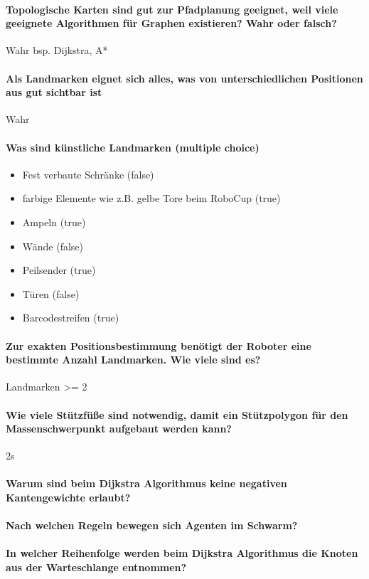 \paragraph{Topologische Karten sind gut zur Pfadplanung geeignet, weil viele geeignete Algorithmen für Graphen existieren? Wahr oder falsch?}
Wahr bsp. Dijkstra, A*
\paragraph{Als Landmarken eignet sich alles, was von unterschiedlichen Positionen aus gut sichtbar ist}
Wahr
\paragraph{Was sind künstliche Landmarken (multiple choice)}
\begin{itemize}
	\item Fest verbaute Schränke (false)
    \item farbige Elemente wie z.B. gelbe Tore beim RoboCup (true)
    \item Ampeln (true)
    \item Wände (false)
    \item Peilsender (true)
    \item Türen (false)
    \item Barcodestreifen (true)
\end{itemize}
\paragraph{Zur exakten Positionsbestimmung benötigt der Roboter eine bestimmte Anzahl Landmarken. Wie viele sind es?}
Landmarken >= 2
\paragraph{Wie viele Stützfüße sind notwendig, damit ein Stützpolygon für den Massenschwerpunkt aufgebaut werden kann?}
2s
\paragraph{Warum sind beim Dijkstra Algorithmus keine negativen Kantengewichte erlaubt?}
\paragraph{Nach welchen Regeln bewegen sich Agenten im Schwarm?}
\paragraph{In welcher Reihenfolge werden beim Dijkstra Algorithmus die Knoten aus der Warteschlange entnommen?}

